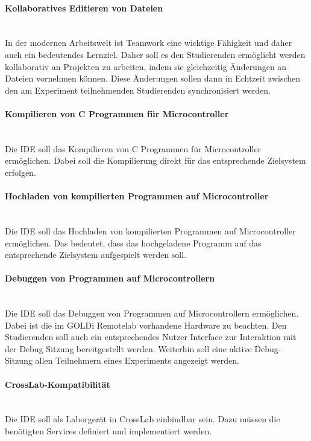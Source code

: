 \paragraph{Kollaboratives Editieren von Dateien} \mbox{} \\
In der modernen Arbeitswelt ist Teamwork eine wichtige Fähigkeit und daher auch ein bedeutendes Lernziel. Daher soll es den Studierenden ermöglicht werden kollaborativ an Projekten zu arbeiten, indem sie gleichzeitig Änderungen an Dateien vornehmen können. Diese Änderungen sollen dann in Echtzeit zwischen den am Experiment teilnehmenden Studierenden synchronisiert werden.

\paragraph{Kompilieren von C Programmen für Microcontroller} \mbox{} \\
Die IDE soll das Kompilieren von C Programmen für Microcontroller ermöglichen. Dabei soll die Kompilierung direkt für das entsprechende Zielsystem erfolgen.

\paragraph{Hochladen von kompilierten Programmen auf Microcontroller} \mbox{} \\
Die IDE soll das Hochladen von kompilierten Programmen auf Microcontroller ermöglichen. Das bedeutet, dass das hochgeladene Programm auf das entsprechende Zielsystem aufgespielt werden soll.

\paragraph{Debuggen von Programmen auf Microcontrollern} \mbox{} \\
Die IDE soll das Debuggen von Programmen auf Microcontrollern ermöglichen. Dabei ist die im GOLDi Remotelab vorhandene Hardware zu beachten. Den Studierenden soll auch ein entsprechendes Nutzer Interface zur Interaktion mit der Debug Sitzung bereitgestellt werden. Weiterhin soll eine aktive Debug-Sitzung allen Teilnehmern eines Experiments angezeigt werden.

\paragraph{CrossLab-Kompatibilität} \mbox{} \\
Die IDE soll als Laborgerät in CrossLab einbindbar sein. Dazu müssen die benötigten Services definiert und implementiert werden.

